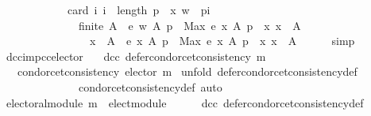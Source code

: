 \begin{isabellebody}
\ \ \ \ \ \ \ \ \ \ \ \ card\ {\isacharbraceleft}{\kern0pt}i{\isachardot}{\kern0pt}\ i\ {\isacharless}{\kern0pt}\ length\ p\ {\isasymand}\ {\isacharparenleft}{\kern0pt}x{\isacharcomma}{\kern0pt}\ w{\isacharparenright}{\kern0pt}\ {\isasymin}\ {\isacharparenleft}{\kern0pt}p{\isacharbang}{\kern0pt}i{\isacharparenright}{\kern0pt}{\isacharbraceright}{\kern0pt}\ {\isasymLongrightarrow}\isanewline
\ \ \ \ \ \ \ \ \ \ \ \ \ \ finite\ A\ {\isasymLongrightarrow}\ e\ w\ A\ p\ {\isacharless}{\kern0pt}\ Max\ {\isacharbraceleft}{\kern0pt}e\ x\ A\ p\ {\isacharbar}{\kern0pt}\ x{\isachardot}{\kern0pt}\ x\ {\isasymin}\ A{\isacharbraceright}{\kern0pt}\ {\isasymLongrightarrow}\isanewline
\ \ \ \ \ \ \ \ \ \ \ \ \ \ \ \ x\ {\isasymin}\ A\ {\isasymLongrightarrow}\ e\ x\ A\ p\ {\isacharless}{\kern0pt}\ Max\ {\isacharbraceleft}{\kern0pt}e\ x\ A\ p\ {\isacharbar}{\kern0pt}\ x{\isachardot}{\kern0pt}\ x\ {\isasymin}\ A{\isacharbraceright}{\kern0pt}{\isachardoublequoteclose}\isanewline
\ \ \ \ \isamarkupfalse%
\ simp\isanewline
{}\isamarkupfalse%
%
\endisatagproof
{\isafoldproof}%
%
\isadelimproof
\isanewline
%
\endisadelimproof
\isanewline
\isanewline
{}\isamarkupfalse%
\ dcc{\isacharunderscore}{\kern0pt}imp{\isacharunderscore}{\kern0pt}cc{\isacharunderscore}{\kern0pt}elector{\isacharcolon}{\kern0pt}\isanewline
\ \ \ dcc{\isacharcolon}{\kern0pt}\ {\isachardoublequoteopen}defer{\isacharunderscore}{\kern0pt}condorcet{\isacharunderscore}{\kern0pt}consistency\ m{\isachardoublequoteclose}\isanewline
\ \ \ {\isachardoublequoteopen}condorcet{\isacharunderscore}{\kern0pt}consistency\ {\isacharparenleft}{\kern0pt}elector\ m{\isacharparenright}{\kern0pt}{\isachardoublequoteclose}\isanewline
%
\isadelimproof
%
\endisadelimproof
%
\isatagproof
{}\isamarkupfalse%
\ {\isacharparenleft}{\kern0pt}unfold\ defer{\isacharunderscore}{\kern0pt}condorcet{\isacharunderscore}{\kern0pt}consistency{\isacharunderscore}{\kern0pt}def\isanewline
\ \ \ \ \ \ \ \ \ \ \ \ \ \ condorcet{\isacharunderscore}{\kern0pt}consistency{\isacharunderscore}{\kern0pt}def{\isacharcomma}{\kern0pt}\ auto{\isacharparenright}{\kern0pt}\isanewline
\ \ \isamarkupfalse%
\ {\isachardoublequoteopen}electoral{\isacharunderscore}{\kern0pt}module\ {\isacharparenleft}{\kern0pt}m\ {\isasymtriangleright}\ elect{\isacharunderscore}{\kern0pt}module{\isacharparenright}{\kern0pt}{\isachardoublequoteclose}\isanewline
\ \ \ \ \isamarkupfalse%
\ dcc\ defer{\isacharunderscore}{\kern0pt}condorcet{\isacharunderscore}{\kern0pt}consistency{\isacharunderscore}{\kern0pt}def\isanewline

\end{isabellebody}
